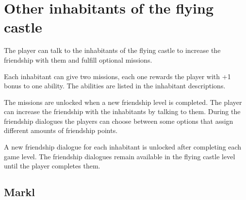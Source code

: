 \section{Other inhabitants of the flying castle}

The player can talk to the inhabitants of the flying castle to increase the friendship with them and fulfill optional missions.

Each inhabitant can give two missions, each one rewards the player with +1 bonus to one ability. The abilities are listed in the inhabitant descriptions.

The missions are unlocked when a new friendship level is completed. The player can increase the friendship with the inhabitants by talking to them. During the friendship dialogues the players can choose between some options that assign different amounts of friendship points.

A new friendship dialogue for each inhabitant is unlocked after completing each game level. The friendship dialogues remain available in the flying castle level until the player completes them.

\subsection{Markl}

